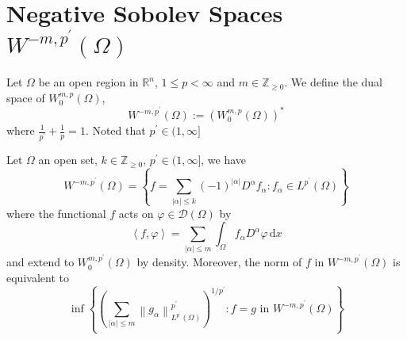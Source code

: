 \section{Negative Sobolev Spaces $W^{-m,p^\prime}\left(\Omega\right)$} %
\begin{definition}
    Let $\Omega$ be an open region in $\mathbb{R}^n$, $1\leq p <\infty$ and $m \in \mathbb{Z}_{\geq 0}$.
    We define the dual space of $W_0^{m, p}\left(\Omega\right)$,
    \begin{equation*}
        W^{-m, p^\prime}\left(\Omega\right)
        :=
        \left(W_0^{m, p}\left(\Omega\right)\right)^*
    \end{equation*}
    where $\frac{1}{p^\prime}+\frac{1}{p}=1$. Noted that $p^\prime \in (1,\infty]$
\end{definition}


\begin{theorem}
    Let $\Omega$ an open set, $k\in \mathbb{Z}_{\geq 0}$, $p^\prime \in (1,\infty]$, we have
    \begin{equation*}
        W^{-m,p^\prime}\left(\Omega\right)
        =
        \left\{
        f=\sum_{\left|\alpha\right|\leq k} \left(-1\right) ^{\left|\alpha\right|} D^\alpha f_\alpha :f_\alpha \in L^{p^\prime}\left(\Omega\right)
        \right\}
    \end{equation*}
    where the functional $f$ acts on $\varphi \in \mathscr{D}\left(\Omega\right)$ by
    \begin{equation*}
        \left\langle f  ,\varphi \right\rangle
        =
        \sum_{\left|\alpha\right|\leq m} \int_\Omega f_\alpha D^\alpha \varphi \, \mathrm{d}x
    \end{equation*}
    and extend to $W_0^{m,p^\prime}\left(\Omega\right)$ by density. Moreover, the norm of $f$ in $W^{-m,p^\prime}\left(\Omega\right)$ is equivalent to
    \begin{equation*}
        \inf
        \left\{
        \left(\sum_{\left|\alpha\right|\leq m} \left\|g_\alpha\right\|_{L^{p^\prime}\left(\Omega\right)}^{p^\prime}\right)^{1/p^\prime}
        :
        f=g \text{ in } W^{-m,p^\prime}\left(\Omega\right)
        \right\}
    \end{equation*}
\end{theorem}




